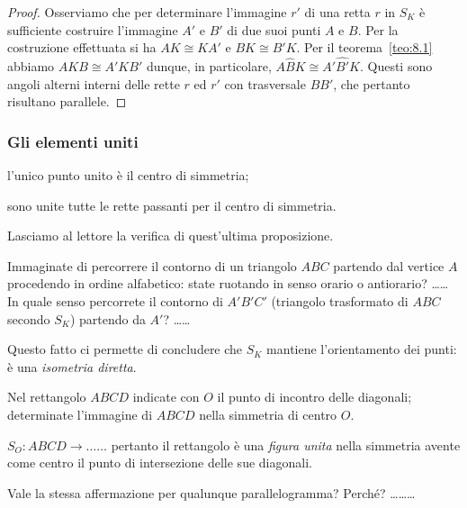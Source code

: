 \noindent\begin{minipage}{0.65\textwidth}\parindent15pt
\begin{proof}
Osserviamo che per determinare l'immagine $r'$ di una retta $r$ in $S_K$ è sufficiente costruire l'immagine $A'$ e $B'$ di due suoi punti $A$ e $B$. Per la costruzione effettuata si ha $AK\cong KA'$ e $BK\cong B'K$. Per il teorema~\ref{teo:8.1} abbiamo $AKB\cong A'KB'$ dunque, in particolare, $A\widehat{B}K\cong A'\widehat{B'}K$. Questi sono angoli alterni interni delle rette $r$ ed $r'$ con trasversale $BB'$, che pertanto risultano parallele.
\end{proof}
\end{minipage}\hfil
\begin{minipage}{0.35\textwidth}
	\centering
\end{minipage}\vspace{8pt}

\subsubsection{Gli elementi uniti}
\begin{itemize*}
\item l'unico punto unito è il centro di simmetria;
\item sono unite tutte le rette passanti per il centro di simmetria.
\end{itemize*}
Lasciamo al lettore la verifica di quest'ultima proposizione.\vspace{8pt}

Immaginate di percorrere il contorno di un triangolo $ABC$ partendo dal vertice $A$ procedendo in ordine alfabetico: state ruotando in senso orario o antiorario? \ldots\ldots{} In quale senso percorrete il contorno di $A'B'C'$ (triangolo trasformato di $ABC$ secondo $S_K$) partendo da $A'$? \ldots\ldots{}

Questo fatto ci permette di concludere che $S_K$ mantiene l'orientamento dei punti: è una \emph{isometria diretta}.

\begin{exrig}
\begin{esempio}
Nel rettangolo $ABCD$ indicate con $O$ il punto di incontro delle diagonali; determinate l'immagine di $ABCD$ nella simmetria di centro $O$.

$S_O:ABCD \rightarrow \ldots\ldots{}$ pertanto il rettangolo è una \emph{figura unita} nella simmetria avente come centro il punto di intersezione delle sue diagonali.

\begin{figure*}[!htb]
    \centering
\end{figure*}

Vale la stessa affermazione per qualunque parallelogramma? Perché? \ldots\ldots\ldots{}

\begin{figure*}[!htb]
    \centering
\end{figure*}

\end{esempio}
\end{exrig}

